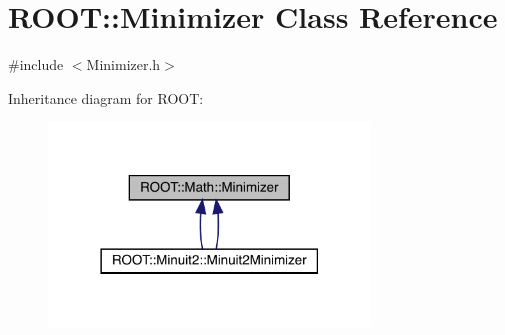 \hypertarget{classROOT_1_1Math_1_1Minimizer}{}\section{R\+O\+OT\+:\+:Minimizer Class Reference}
\label{classROOT_1_1Math_1_1Minimizer}


{\ttfamily \#include $<$Minimizer.\+h$>$}



Inheritance diagram for R\+O\+OT\+:\nopagebreak
\begin{figure}[H]
\begin{center}
\leavevmode
\includegraphics[width=242pt]{d5/d2f/classROOT_1_1Math_1_1Minimizer__inherit__graph}
\end{center}
\end{figure}
